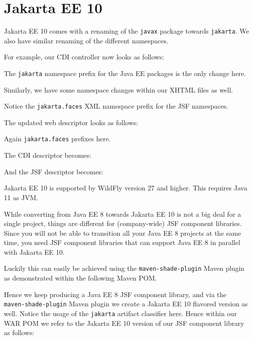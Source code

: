 %

\chapter{Jakarta EE 10}

Jakarta EE 10 comes with a renaming of the \texttt{javax} package towards \texttt{jakarta}.
We also have similar renaming of the different namespaces.

For example, our CDI controller now looks as follows:

The \texttt{jakarta} namespace prefix for the Java EE packages is the only change here.

Similarly, we have some namespace changes within our XHTML files as well.

Notice the \texttt{jakarta.faces} XML namespace prefix for the JSF namespaces.

The updated web descriptor looks as follows:

Again \texttt{jakarta.faces} prefixes here.

The CDI descriptor becomes:

And the JSF descriptor becomes:


Jakarta EE 10 is supported by WildFly version 27 and higher.
This requires Java 11 as JVM.

While converting from Java EE 8 towards Jakarta EE 10 is not a big deal for a single project, things are different for (company-wide) JSF component libraries.
Since you will not be able to transition all your Java EE 8 projects at the same time, you need JSF component libraries that can support Java EE 8 in parallel with Jakarta EE 10.

Luckily this can easily be achieved using the \texttt{maven-shade-plugin} Maven plugin as demonstrated within the following Maven POM.

Hence we keep producing a Java EE 8 JSF component library, and via the \texttt{maven-shade-plugin} Maven plugin we create a Jakarta EE 10 flavored version as well.
Notice the usage of the \texttt{jakarta} artifact classifier here.
Hence within our WAR POM we refer to the Jakarta EE 10 version of our JSF component library as follows:
